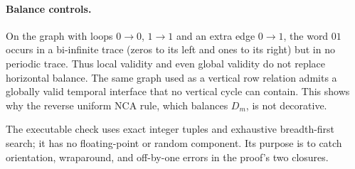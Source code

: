 \paragraph{Balance controls.}
On the graph with loops $0\to0$, $1\to1$ and an extra edge $0\to1$, the word $01$ occurs in a bi-infinite trace (zeros to its left and ones to its right) but in no periodic trace.  Thus local validity and even global validity do not replace horizontal balance.  The same graph used as a vertical row relation admits a globally valid temporal interface that no vertical cycle can contain.  This shows why the reverse uniform NCA rule, which balances $D_m$, is not decorative.

The executable check uses exact integer tuples and exhaustive breadth-first search; it has no floating-point or random component.  Its purpose is to catch orientation, wraparound, and off-by-one errors in the proof's two closures.
